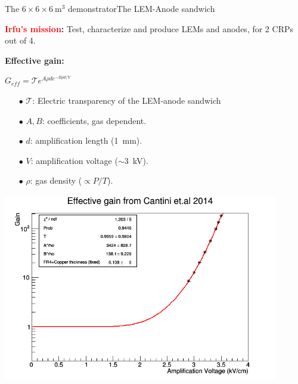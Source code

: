 \documentclass[10pt]{beamer}
\begin{document}
    \begin{frame}{The \texorpdfstring{$6 \times 6 \times \SI{6}{\meter\cubed}$}{666}
    		demonstrator}{The LEM-Anode sandwich}
	    	\begin{scriptsize}
			     \textbf{\textcolor{red}{Irfu's mission}: }Test, characterize and produce  LEMs and anodes, for 2 CRPs out of 4.\\\vfill
			\end{scriptsize}
	   		\begin{minipage}{0.48\textwidth}
	   			\begin{scriptsize}
		   			\textbf{Effective gain:}\\
		   		\end{scriptsize}
	   			$G_{eff} = \mathcal{T}e^{A\rho d e^{-B\rho d/V}}$\\
	   			\begin{tiny}
	    			\begin{itemize}
	    				\item[$\bullet$] $\mathcal{T}$: Electric transparency of the LEM-anode sandwich
	    				\item[$\bullet$] $A,B$: coefficients, gas dependent.
	    				\item[$\bullet$] $d$: amplification length (\SI{1}{\milli\meter}).
	    				\item[$\bullet$] $V$: amplification voltage ($\sim$\SI{3}{\kilo\volt}).
	    				\item[$\bullet$] $\rho$: gas density ($\propto P/T$).
	    			\end{itemize}
	    		\end{tiny} 
	   			\vfill
				\includegraphics[width=0.9\textwidth]{figures/666/3L_gain.png}
	   		\end{minipage}\hfill
	   		\begin{minipage}{0.48\textwidth}

\end{minipage}
\end{frame}
\end{document}
